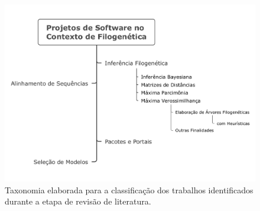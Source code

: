 \documentclass[english,brazilian]{UNISINOSmonografia} %
\newcommand\defaultFigureWidth{0.9}
\begin{document}

\begin{figure}[tb]
	\centering%
	\begin{minipage}{\defaultFigureWidth\textwidth}
		\caption{Taxonomia elaborada para a classificação dos trabalhos identificados durante a etapa de revisão de literatura.}
		\label{fig:taxonomia}
		\includegraphics[trim=15 40 15 40,clip,width=\textwidth]{taxonomia}
	\end{minipage}
\end{figure}
\end{document}
